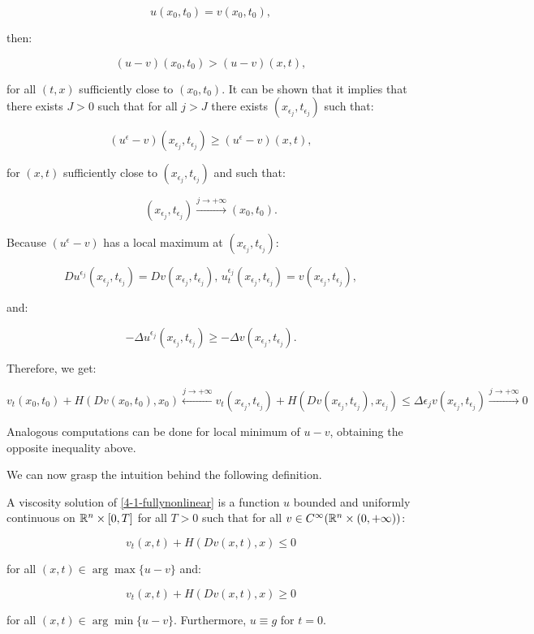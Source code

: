 \[u(x_0,t_0) = v(x_0,t_0),\]

then:

\[(u-v)(x_0,t_0) > (u-v)(x,t),\]

for all $(t,x)$ sufficiently close to $(x_0,t_0)$. It can be shown that it implies that there exists $J>0$ such that for all 
$j>J$ there exists $(x_{\epsilon_j},t_{\epsilon_j})$ such that:

\[(u^{\epsilon}-v)(x_{\epsilon_j},t_{\epsilon_j}) \geq (u^{\epsilon}-v)(x,t),\]

for $(x,t)$ sufficiently close to $(x_{\epsilon_j},t_{\epsilon_j})$ and such that:

\[(x_{\epsilon_j},t_{\epsilon_j})\xrightarrow{j\to+\infty}(x_0,t_0).\]

Because $(u^{\epsilon}-v)$ has a local maximum at $(x_{\epsilon_j},t_{\epsilon_j})$:

\[Du^{\epsilon_j}(x_{\epsilon_j},t_{\epsilon_j})=Dv(x_{\epsilon_j},t_{\epsilon_j}),\,u^{\epsilon_j}_t(x_{\epsilon_j},t_{\epsilon_j}) =v(x_{\epsilon_j},t_{\epsilon_j}),\]

and:

\[-\Delta u^{\epsilon_j}(x_{\epsilon_j},t_{\epsilon_j}) \geq -\Delta v(x_{\epsilon_j},t_{\epsilon_j}).\]

Therefore, we get:

\[v_t(x_0,t_0)+H(Dv(x_0,t_0),x_0)\xleftarrow{j\to+\infty}v_t(x_{\epsilon_j},t_{\epsilon_j}) +H(Dv(x_{\epsilon_j},t_{\epsilon_j}) ,x_{\epsilon_j})\leq \Delta \epsilon_jv(x_{\epsilon_j},t_{\epsilon_j}) \xrightarrow{j\to+\infty}0\]

Analogous computations can be done for local minimum of $u-v$, obtaining the opposite inequality above.

We can now grasp the intuition behind the following definition.

\begin{definition}
    A viscosity solution of \ref{4-1-fullynonlinear} is a function $u$ bounded and uniformly continuous on $\mathbb{R}^n\times[0,T]$ for all $T>0$ such that 
    for all $v\in C^{\infty}(\mathbb{R}^n\times(0,+\infty))$:

    \[v_t(x,t)+H(Dv(x,t),x)\leq0\]

    for all $(x,t)\in\arg \max\{u-v\}$ and:

    \[v_t(x,t)+H(Dv(x,t),x)\geq0\]

    for all $(x,t)\in\arg \min\{u-v\}$. Furthermore, $u\equiv g$ for $t=0$. 
\end{definition}

